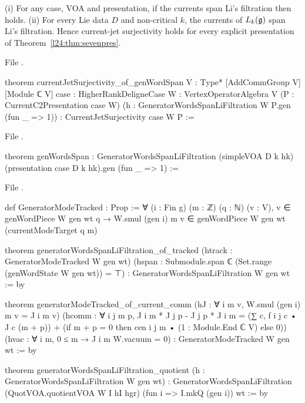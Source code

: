 \begin{theorem}\label{l24:thm:jetsurj}
(i) For any case, VOA and presentation, if the currents span Li's filtration then
 holds. (ii) For every Lie data $D$ and non-critical $k$, the currents of
$L_k(\mathfrak g)$ span Li's filtration. Hence current-jet surjectivity holds for every explicit
presentation of Theorem~\ref{l24:thm:sevenpres}.
\end{theorem}
\noindent File .
\begin{leancode}
theorem currentJetSurjectivity_of_genWordSpan {V : Type*} [AddCommGroup V] [Module ℂ V]
    {case : HigherRankDeligneCase} {W : VertexOperatorAlgebra V}
    (P : CurrentC2Presentation case W)
    (h : GeneratorWordsSpanLiFiltration W P.gen (fun _ => 1)) :
    CurrentJetSurjectivity case W P :=
\end{leancode}
\noindent File .
\begin{leancode}
theorem genWordsSpan :
    GeneratorWordsSpanLiFiltration (simpleVOA D k hk) (presentation case D k hk).gen (fun _ => 1) :=
\end{leancode}
\noindent File .
\begin{leancode}
def GeneratorModeTracked : Prop :=
  ∀ (i : Fin g) (m : ℤ) (q : ℕ) (v : V), v ∈ genWordPiece W gen wt q →
    W.smul (gen i) m v ∈ genWordPiece W gen wt (currentModeTarget q m)

theorem generatorWordsSpanLiFiltration_of_tracked (htrack : GeneratorModeTracked W gen wt)
    (hspan : Submodule.span ℂ (Set.range (genWordState W gen wt)) = ⊤) :
    GeneratorWordsSpanLiFiltration W gen wt := by

theorem generatorModeTracked_of_current_comm (hJ : ∀ i m v, W.smul (gen i) m v = J i m v)
    (hcomm : ∀ i j m p, J i m * J j p - J j p * J i m =
      (∑ c, f i j c • J c (m + p)) +
        (if m + p = 0 then cen i j m • (1 : Module.End ℂ V) else 0))
    (hvac : ∀ i m, 0 ≤ m → J i m W.vacuum = 0) :
    GeneratorModeTracked W gen wt := by

theorem generatorWordsSpanLiFiltration_quotient (h : GeneratorWordsSpanLiFiltration W gen wt) :
    GeneratorWordsSpanLiFiltration (QuotVOA.quotientVOA W I hI hgr)
      (fun i => I.mkQ (gen i)) wt := by
\end{leancode}

